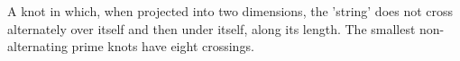  A knot in which, when projected into two dimensions, the 'string' does
not cross alternately over itself and then under itself, along its length.
The smallest non-alternating prime knots have eight crossings.
